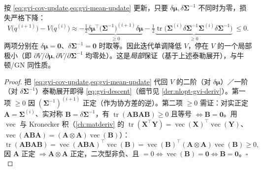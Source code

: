 \begin{theorem}\label{thm:nlopt-gvi-conv}
按 \cref{eq:gvi-cov-update,eq:gvi-mean-update} 更新，只要 $\delta\boldsymbol{\mu},\delta\boldsymbol{\Sigma}^{-1}$ 不同时为零，损失严格下降：
\begin{equation}
  V\!\big(q^{(i+1)}\big)-V\!\big(q^{(i)}\big)\approx
  -\tfrac12\underbrace{\delta\boldsymbol{\mu}^\top\big(\boldsymbol{\Sigma}^{-1}\big)^{(i+1)}\delta\boldsymbol{\mu}}_{\ge0}
  -\tfrac12\underbrace{\operatorname{tr}\!\big(\boldsymbol{\Sigma}^{(i)}\delta\boldsymbol{\Sigma}^{-1}\boldsymbol{\Sigma}^{(i)}\delta\boldsymbol{\Sigma}^{-1}\big)}_{\ge0}\ \le 0.
  \label{eq:gvi-descent}
\end{equation}
两项分别在 $\delta\boldsymbol{\mu}=\mathbf{0}$、$\delta\boldsymbol{\Sigma}^{-1}=\mathbf{0}$ 时取等。因此迭代单调降低 $V$，停在 $V$ 的一个局部极小（即 $\partial V/\partial\boldsymbol{\mu},\partial V/\partial\boldsymbol{\Sigma}^{-1}$ 均零处）。这是\emph{局部}保证（基于上述泰勒展开），与牛顿/GN 同性质。
\end{theorem}
\begin{proof}
把 \cref{eq:gvi-cov-update,eq:gvi-mean-update} 代回 $V$ 的二阶（对 $\delta\boldsymbol{\mu}$）／一阶（对 $\delta\boldsymbol{\Sigma}^{-1}$）泰勒展开即得 \cref{eq:gvi-descent}（细节见 \cref{der:nlopt-gvi-deriv}）。第一项 $\ge0$ 因 $(\boldsymbol{\Sigma}^{-1})^{(i+1)}$ 正定（作为协方差的逆）。第二项 $\ge0$ 需证：对实正定 $\mathbf{A}=\boldsymbol{\Sigma}^{(i)}$、实对称 $\mathbf{B}=\delta\boldsymbol{\Sigma}^{-1}$，有 $\operatorname{tr}(\mathbf{A}\mathbf{B}\mathbf{A}\mathbf{B})\ge0$ 且等号 $\iff\mathbf{B}=\mathbf{0}$。用 $\operatorname{vec}$ 与 Kronecker 积（\cref{ch:matderiv} 的 $\operatorname{tr}(\mathbf{X}^\top\mathbf{Y})=\operatorname{vec}(\mathbf{X})^\top\operatorname{vec}(\mathbf{Y})$、$\operatorname{vec}(\mathbf{A}\mathbf{B}\mathbf{A})=(\mathbf{A}\otimes\mathbf{A})\operatorname{vec}(\mathbf{B})$）：
\[
  \operatorname{tr}(\mathbf{A}\mathbf{B}\mathbf{A}\mathbf{B})=\operatorname{vec}(\mathbf{A}\mathbf{B}\mathbf{A})^\top\operatorname{vec}(\mathbf{B})=\operatorname{vec}(\mathbf{B})^\top(\mathbf{A}\otimes\mathbf{A})\operatorname{vec}(\mathbf{B})\ge0,
\]
因 $\mathbf{A}$ 正定 $\Rightarrow\mathbf{A}\otimes\mathbf{A}$ 正定，二次型非负、且 $=0\iff\operatorname{vec}(\mathbf{B})=\mathbf{0}\iff\mathbf{B}=\mathbf{0}$。\hfill$\square$
\end{proof}

